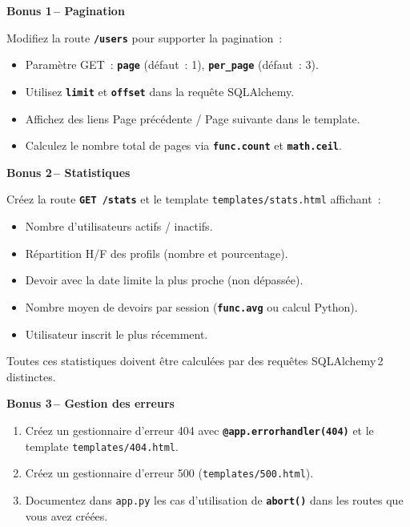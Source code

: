 \documentclass[12pt,a4paper]{article}
\newcommand{\fichier}[1]{\texttt{\textcolor{primary}{#1}}}
\newcommand{\kw}[1]{\texttt{\textbf{#1}}}
\begin{document}
\begin{mdframed}[style=exercice]

\textbf{Bonus 1\,– Pagination}

Modifiez la route \kw{/users} pour supporter la pagination~:
\begin{itemize}
    \item Paramètre GET~: \kw{page} (défaut~: 1), \kw{per\_page} (défaut~: 3).
    \item Utilisez \kw{limit} et \kw{offset} dans la requête SQLAlchemy.
    \item Affichez des liens \og Page précédente \fg{} / \og Page suivante \fg{} dans le template.
    \item Calculez le nombre total de pages via \kw{func.count} et \kw{math.ceil}.
\end{itemize}

\textbf{Bonus 2\,– Statistiques}

Créez la route \kw{GET /stats} et le template \fichier{templates/stats.html} affichant~:
\begin{itemize}
    \item Nombre d'utilisateurs actifs / inactifs.
    \item Répartition H/F des profils (nombre et pourcentage).
    \item Devoir avec la date limite la plus proche (non dépassée).
    \item Nombre moyen de devoirs par session (\kw{func.avg} ou calcul Python).
    \item Utilisateur inscrit le plus récemment.
\end{itemize}
Toutes ces statistiques doivent être calculées par des requêtes SQLAlchemy\,2 distinctes.

\textbf{Bonus 3\,– Gestion des erreurs}

\begin{enumerate}[label=\textbf{\arabic*.}]
    \item Créez un gestionnaire d'erreur 404 avec \kw{@app.errorhandler(404)} et le template \fichier{templates/404.html}.
    \item Créez un gestionnaire d'erreur 500 (\fichier{templates/500.html}).
    \item Documentez dans \fichier{app.py} les cas d'utilisation de \kw{abort()} dans les routes que vous avez créées.
\end{enumerate}

\end{mdframed}
\end{document}
